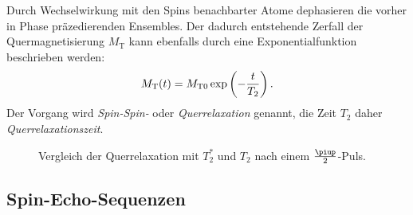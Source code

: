 \documentclass[
    11pt,
    ngerman
]{scrreprt}
\begin{document}
Durch Wechselwirkung mit den Spins benachbarter Atome dephasieren die vorher in
Phase präzedierenden Ensembles. Der dadurch entstehende Zerfall der
Quermagnetisierung $M_\text{T}$ kann ebenfalls durch eine Exponentialfunktion
beschrieben werden:
\[
    M_\text{T}(t) = M_{\text{T}0}\exp\left({-\frac{t}{T_2}}\right).
\]
Der Vorgang wird \emph{Spin-Spin-} oder \emph{Querrelaxation} genannt, die Zeit $T_2$ daher \emph{Querrelaxationszeit}. 

\begin{figure}[htbp]
\begin{minipage}[htbp]{.45\textwidth}
    \centering
    \caption{%
        Sättigungsrückgewinnung nach einem $\frac\piup2$-Puls.
    }
\end{minipage}
\hfill
\begin{minipage}[htbp]{.45\textwidth}
    \centering
    \caption{%
        Vergleich der Querrelaxation mit $T_2^*$ und $T_2$ nach einem $\frac\piup2$-Puls. 
    }
\end{minipage}
\end{figure}


\subsection{Spin-Echo-Sequenzen}
\end{document}

